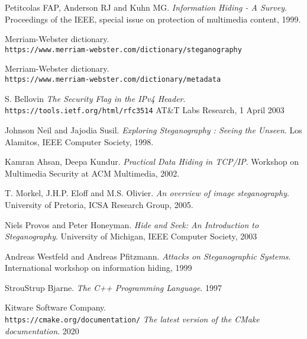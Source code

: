 \documentclass[notitlepage]{report}
\begin{document}
\begin{thebibliography}{15}
Petitcolas FAP, Anderson RJ and Kuhn MG.
\textit{Information Hiding - A Survey}.
Proceedings of the IEEE, special issue on protection of multimedia content, 1999.


Merriam-Webster dictionary.
\\\texttt{https://www.merriam-webster.com/dictionary/steganography}

Merriam-Webster dictionary.
\\\texttt{https://www.merriam-webster.com/dictionary/metadata}

S. Bellovin
\textit{The Security Flag in the IPv4 Header}. 
\\\texttt{https://tools.ietf.org/html/rfc3514}
AT\&T Labs Research, 1 April 2003

Johnson Neil and Jajodia Susil.
\textit{Exploring Steganography : Seeing the Unseen}. 
Los Alamitos, IEEE Computer Society, 1998.

Kamran Ahsan, Deepa Kundur.
\textit{Practical Data Hiding in TCP/IP}. 
Workshop on Multimedia Security at ACM Multimedia, 2002.

%
T. Morkel, J.H.P. Eloff and M.S. Olivier. 
\textit{An overview of image steganography}.
University of Pretoria, ICSA Research Group, 2005.

Niels Provos and Peter Honeyman.
\textit{Hide and Seek: An Introduction to Steganography}.
University of Michigan, IEEE Computer Society, 2003

Andreas Westfeld and Andreas Pfitzmann.
\textit{Attacks on Steganographic Systems}.
International workshop on information hiding, 1999

StrouStrup Bjarne.
\textit{The C++ Programming Language}.
1997

Kitware Software Company.
\\\texttt{https://cmake.org/documentation/}
\textit{The latest version of the CMake documentation}.
2020
\end{thebibliography}
\end{document}
